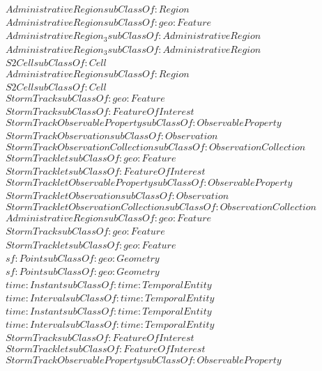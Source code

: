 \begin{align}
  AdministrativeRegion subClassOf: Region\\
  AdministrativeRegion subClassOf: geo:Feature\\
  AdministrativeRegion_3 subClassOf: AdministrativeRegion\\
  AdministrativeRegion_3 subClassOf: AdministrativeRegion\\
  S2Cell subClassOf: Cell\\
  AdministrativeRegion subClassOf: Region\\
  S2Cell subClassOf: Cell\\
  StormTrack subClassOf: geo:Feature\\
  StormTrack subClassOf: FeatureOfInterest\\
  StormTrackObservableProperty subClassOf: ObservableProperty\\
  StormTrackObservation subClassOf: Observation\\
  StormTrackObservationCollection subClassOf: ObservationCollection\\
  StormTracklet subClassOf: geo:Feature\\
  StormTracklet subClassOf: FeatureOfInterest\\
  StormTrackletObservableProperty subClassOf: ObservableProperty\\
  StormTrackletObservation subClassOf: Observation\\
  StormTrackletObservationCollection subClassOf: ObservationCollection\\
  AdministrativeRegion subClassOf: geo:Feature\\
  StormTrack subClassOf: geo:Feature\\
  StormTracklet subClassOf: geo:Feature\\
  sf:Point subClassOf: geo:Geometry\\
  sf:Point subClassOf: geo:Geometry\\
  time:Instant subClassOf: time:TemporalEntity\\
  time:Interval subClassOf: time:TemporalEntity\\
  time:Instant subClassOf: time:TemporalEntity\\
  time:Interval subClassOf: time:TemporalEntity\\
  StormTrack subClassOf: FeatureOfInterest\\
  StormTracklet subClassOf: FeatureOfInterest\\
  StormTrackObservableProperty subClassOf: ObservableProperty\\

\end{align}

